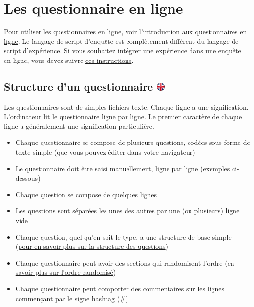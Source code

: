 \documentclass[
]{book}
\providecommand{\tightlist}{%
  \setlength{\itemsep}{0pt}\setlength{\parskip}{0pt}}
\begin{document}
\hypertarget{s8}{%
\chapter{Les questionnaire en ligne}\label{s8}}

Pour utiliser les questionnaires en ligne, voir
\protect\hyperlink{s7}{l'introduction aux questionnaires en ligne}. Le
langage de script d'enquête est complètement différent du langage de
script d'expérience. Si vous souhaitez intégrer une expérience dans une
enquête en ligne, vous devez suivre
\href{https://www.psytoolkit.org/doc3.2.0/online-survey-syntax.html\#experiment}{ces
instructions}.

\hypertarget{structure-dun-questionnaire}{%
\section[Structure d'un questionnaire ]{\texorpdfstring{Structure d'un
questionnaire
\href{https://www.psytoolkit.org/doc3.1.0/online-survey-syntax.html\#_structure_of_questionnaire}{\protect\includegraphics{img/ukflag.png}}}{Structure d'un questionnaire }}\label{structure-dun-questionnaire}}

Les questionnaires sont de simples fichiers texte. Chaque ligne a une
signification. L'ordinateur lit le questionnaire ligne par ligne. Le
premier caractère de chaque ligne a généralement une signification
particulière.

\begin{itemize}
\tightlist
\item
  Chaque questionnaire se compose de plusieurs questions, codées sous
  forme de texte simple (que vous pouvez éditer dans votre navigateur)
\item
  Le questionnaire doit être saisi manuellement, ligne par ligne
  (exemples ci-dessous)
\item
  Chaque question se compose de quelques lignes
\item
  Les questions sont séparées les unes des autres par une (ou plusieurs)
  ligne vide
\item
  Chaque question, quel qu'en soit le type, a une structure de base
  simple (\protect\hyperlink{s8-1-1}{pour en savoir plus sur la
  structure des questions})
\item
  Chaque questionnaire peut avoir des sections qui randomisent l'ordre
  (\protect\hyperlink{}{en savoir plus sur l'ordre randomisé})
\item
  Chaque questionnaire peut comporter des
  \protect\hyperlink{}{commentaires} sur les lignes commençant par le
  signe hashtag (\#)
\end{itemize}
\end{document}
